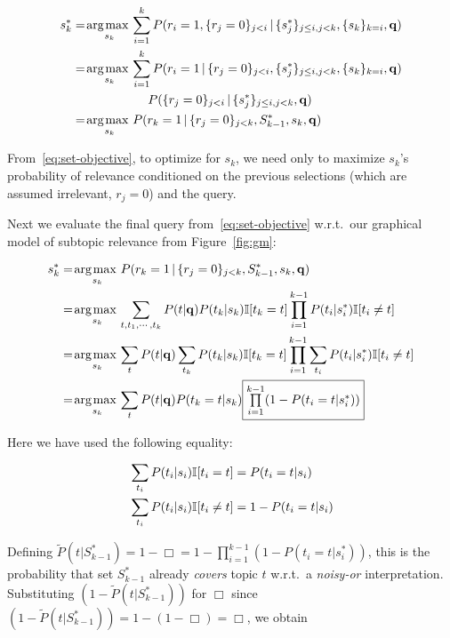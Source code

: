 \begin{align}   
s_k^* & = \argmax_{s_k} \sum_{i=1}^{k} P(  r_i=1, \{ r_{j}=0 \}_{j<i} \, | \, \{ s^*_j \}_{j\leq i,j<k},\{ s_{k} \}_{k=i},\vec{q}) \nonumber \\
   &= \argmax_{s_k} \sum_{i=1}^{k} P(  r_i=1 \, | \, \{ r_{j}=0 \}_{j<i} , \{ s^*_j \}_{j\leq i,j<k},\{ s_k \}_{k=i},\vec{q}) \nonumber\\
   & \hspace{21.5mm} P(\{ r_{j}=0 \}_{j<i} \, | \, \{ s^*_j \}_{j\leq i,j<k}, \vec{q}) \nonumber \\
   &= \argmax_{s_k} P( r_k=1 \, | \, \{ r_{j}=0 \}_{j<k}, S_{k-1}^*,s_k,\vec{q}) \label{eq:set-objective}
\end{align}

From~\eqref{eq:set-objective}, to optimize for $s_k$, we need only to maximize $s_k$'s probability of relevance conditioned on the previous selections (which are assumed irrelevant, $r_j=0$) and the query.

Next we evaluate the final query from~\eqref{eq:set-objective} w.r.t.\
our graphical model of subtopic relevance from Figure~\ref{fig:gm}:

\begin{align}
s_k^* & = \argmax_{s_{k}} P( r_k=1 \, | \, \{ r_{j}=0 \}_{j<k}, S_{k-1}^*,s_k,\vec{q}) \nonumber \\
& = \argmax_{s_{k}} \sum_{t, t_1, \cdots, t_{k}} P(t|\vec{q}) P(t_k|s_k) \I[t_k = t] \prod_{i=1}^{k-1} P(t_i|s_i^*) \I[t_i\neq t]\nonumber \\
& = \argmax_{s_{k}} \sum_{t} P(t|\vec{q}) \sum_{t_{k}} P(t_k|s_k) \I[t_k = t] \prod_{i=1}^{k-1} \sum_{t_{i}} P(t_i|s_i^*) \I[t_i \neq t]\nonumber \\
& = \argmax_{s_{k}} \sum_{t} P(t|\vec{q}) P(t_k=t|s_k) \fbox{$\prod\limits_{i=1}^{k-1} (1 - P(t_i=t|s_i^*))$} \label{eq:partial_simp}
\end{align}

Here we have used the following equality:

\begin{align*}
& \sum_{t_{i}} P(t_i|s_i) \mathbb{I}[t_i = t] =  P(t_i=t|s_i) \\
& \sum_{t_{i}} P(t_i|s_i) \mathbb{I}[t_i \neq t] = 1 - P(t_i=t|s_i)
\end{align*}

Defining $\tilde{P}(t | S_{k-1}^*) = 1 - \Box = 1 - \prod_{i=1}^{k-1} (1 -
  P(t_i=t|s_i^*))$, this is the probability that 
set $S_{k-1}^*$ already \emph{covers} topic $t$ 
w.r.t.\ a \emph{noisy-or} interpretation.  Substituting
$(1 - \tilde{P}(t | S_{k-1}^*))$ for $\Box$ since 
$(1 - \tilde{P}(t | S_{k-1}^*)) = 1 - (1 - \Box) = \Box$, we obtain

